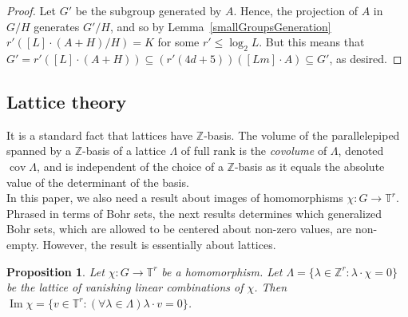 \documentclass[a4paper,11pt]{article}
\numberwithin{theorem}{section}
\newtheorem{proposition}[theorem]{Proposition}
\theoremstyle{definition}
\newcommand{\on}[1]{
	\operatorname{#1}
}
\begin{document}
\begin{proof}
    Let $G'$ be the subgroup generated by $A$. Hence, the projection of $A$ in $G/H$ generates $G' / H$, and so by Lemma~\ref{smallGroupsGeneration} $r' ([L] \cdot (A + H)/H) = K$ for some $r' \leq \log_2 L$. But this means that $G' = r' ([L] \cdot (A + H)) \subseteq (r'(4d + 5))([Lm] \cdot A) \subseteq G'$, as desired.  
    \end{proof}




\subsection{Lattice theory}

It is a standard fact that lattices have $\mathbb{Z}$-basis. The volume of the parallelepiped spanned by a $\mathbb{Z}$-basis of a lattice $\Lambda$ of full rank is the \textit{covolume} of $\Lambda$, denoted $\on{cov} \Lambda$, and is independent of the choice of a $\mathbb{Z}$-basis as it equals the absolute value of the determinant of the basis.\\

In this paper, we also need a result about images of homomorphisms $\chi : G \to \mathbb{T}^r$. Phrased in terms of Bohr sets, the next results determines which generalized Bohr sets, which are allowed to be centered about non-zero values, are non-empty. However, the result is essentially about lattices.

\begin{proposition}
    Let $\chi : G \to \mathbb{T}^r$ be a homomorphism. Let $\Lambda = \{\lambda \in \mathbb{Z}^r : \lambda \cdot \chi = 0\}$ be the lattice of vanishing linear combinations of $\chi$. Then $\on{Im} \chi = \{v \in \mathbb{T}^r : (\forall \lambda \in \Lambda) \lambda \cdot v = 0\}$.
\end{proposition}
\end{document}
